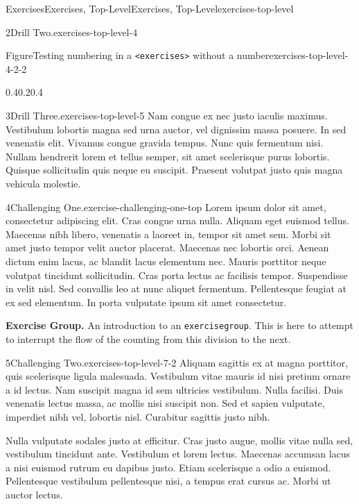 \documentclass[twoside,10pt,]{article}
\newcommand{\mono}[1]{\texttt{#1}}
\numberwithin{equation}{section}
\begin{document}
\begin{exercises-section}{Exercises}{Exercises, Top-Level}{}{Exercises, Top-Level}{}{}{exercises-top-level}
\begin{divisionexercise}{2}{Drill Two.}{}{exercises-top-level-4}
\begin{figureptx}{Figure}{Testing numbering in a \mono{<exercises>} without a number}{exercises-top-level-4-2-2}{}
\begin{image}{0.4}{0.2}{0.4}{}
\end{image}%
\tcblower
\end{figureptx}%
\end{divisionexercise}%
\begin{divisionexercise}{3}{Drill Three.}{}{exercises-top-level-5}%
Nam congue ex nec justo iaculis maximus. Vestibulum lobortis magna sed urna auctor, vel dignissim massa posuere. In sed venenatis elit. Vivamus congue gravida tempus. Nunc quis fermentum nisi. Nullam hendrerit lorem et tellus semper, sit amet scelerisque purus lobortis. Quisque sollicitudin quis neque eu suscipit. Praesent volutpat justo quis magna vehicula molestie.%
\end{divisionexercise}%
\begin{divisionexercise}{4}{Challenging One.}{}{exercise-challenging-one-top}%
Lorem ipsum dolor sit amet, consectetur adipiscing elit. Cras congue urna nulla. Aliquam eget euismod tellus. Maecenas nibh libero, venenatis a laoreet in, tempor sit amet sem. Morbi sit amet justo tempor velit auctor placerat. Maecenas nec lobortis orci. Aenean dictum enim lacus, ac blandit lacus elementum nec. Mauris porttitor neque volutpat tincidunt sollicitudin. Cras porta lectus ac facilisis tempor. Suspendisse in velit nisl. Sed convallis leo at nunc aliquet fermentum. Pellentesque feugiat at ex sed elementum. In porta vulputate ipsum sit amet consectetur.%
\end{divisionexercise}%
\par\medskip\noindent%
\textbf{Exercise Group.}\space\space%
An introduction to an \mono{exercisegroup}.  This is here to attempt to interrupt the flow of the counting from this division to the next.%
\begin{exercisegroup}
\begin{divisionexerciseeg}{5}{Challenging Two.}{}{exercises-top-level-7-2}%
Aliquam sagittis ex at magna porttitor, quis scelerisque ligula malesuada. Vestibulum vitae mauris id nisi pretium ornare a id lectus. Nam suscipit magna id sem ultricies vestibulum. Nulla facilisi. Duis venenatis lectus massa, ac mollis nisi suscipit non. Sed et sapien vulputate, imperdiet nibh vel, lobortis nisl. Curabitur sagittis justo nibh.%
\par
Nulla vulputate sodales justo at efficitur. Cras justo augue, mollis vitae nulla sed, vestibulum tincidunt ante. Vestibulum et lorem lectus. Maecenas accumsan lacus a nisi euismod rutrum eu dapibus justo. Etiam scelerisque a odio a euismod. Pellentesque vestibulum pellentesque nisi, a tempus erat cursus ac. Morbi ut auctor lectus.%

\end{divisionexerciseeg}
\end{exercisegroup}
\end{exercises-section}
\end{document}
